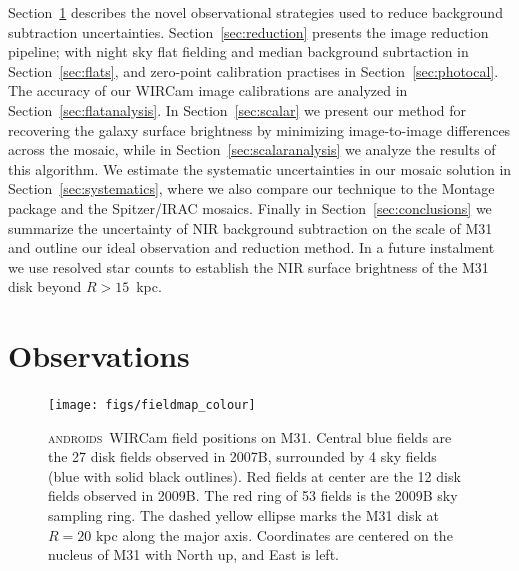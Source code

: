 \documentclass[iop]{emulateapj}
\newcommand{\androids}{\textsc{androids}}
\begin{document}
Section~\ref{sec:Observations} describes the novel observational strategies used to reduce background subtraction uncertainties.
Section~\ref{sec:reduction} presents the image reduction pipeline; with night sky flat fielding and median background subrtaction in Section~\ref{sec:flats}, and zero-point calibration practises in Section~\ref{sec:photocal}.
The accuracy of our WIRCam image calibrations are analyzed in Section~\ref{sec:flatanalysis}.
In Section~\ref{sec:scalar} we present our method for recovering the galaxy surface brightness by minimizing image-to-image differences across the mosaic, while in Section~\ref{sec:scalaranalysis} we analyze the results of this algorithm.
We estimate the systematic uncertainties in our mosaic solution in Section~\ref{sec:systematics}, where we also compare our technique to the Montage package \citep{Berriman:2008} and the Spitzer/IRAC mosaics.
Finally in Section~\ref{sec:conclusions} we summarize the uncertainty of NIR background subtraction on the scale of M31 and outline our ideal observation and reduction method.
In a future instalment we use resolved star counts to establish the NIR surface brightness of the M31 disk beyond $R > 15$~kpc.

\section{Observations}
\label{sec:Observations}

\begin{figure}[t]
\centering
\texttt{[image: figs/fieldmap\_colour]}
\caption{\androids\ WIRCam field positions on M31.
Central blue fields are the 27 disk fields observed in 2007B, surrounded by 4 sky fields (blue with solid black outlines).
Red fields at center are the 12 disk fields observed in 2009B.
The red ring of 53 fields is the 2009B sky sampling ring.
The dashed yellow ellipse marks the M31 disk at $R=20$ kpc along the major axis.
Coordinates are centered on the nucleus of M31 with North up, and East is left.}
\label{fig:fieldmap}
\end{figure}

\end{document}
